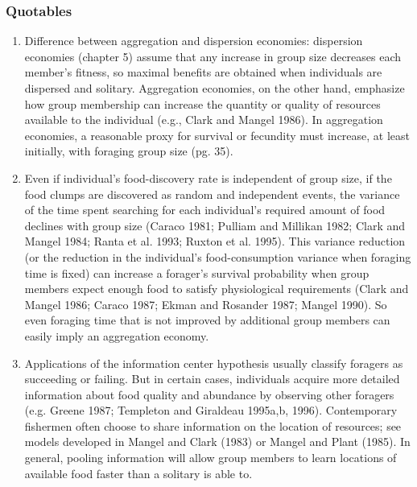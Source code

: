 \documentclass[a4paper,11pt]{article}
\begin{document}
\subsubsection*{Quotables}
\begin{enumerate}
\item Difference between aggregation and dispersion economies: dispersion economies (chapter 5) assume that any increase in group size decreases each member's fitness, so maximal benefits are obtained when individuals are dispersed and solitary. Aggregation economies, on the other hand, emphasize how group membership can increase the quantity or quality of resources available to the individual (e.g., Clark and Mangel 1986). In aggregation economies, a reasonable proxy for survival or fecundity must increase, at least initially, with foraging group size (pg. 35).
\item Even if individual's food-discovery rate is independent of group size, if the food clumps are discovered as random and independent events, the variance of the time spent searching for each individual's required amount of food declines with group size (Caraco 1981; Pulliam and Millikan 1982; Clark and Mangel 1984; Ranta et al. 1993; Ruxton et al. 1995). This variance reduction (or the reduction in the individual's food-consumption variance when foraging time is fixed) can increase a forager's survival probability when group members expect enough food to satisfy physiological requirements (Clark and Mangel 1986; Caraco 1987; Ekman and Rosander 1987; Mangel 1990). So even foraging time that is not improved by additional group members can easily imply an aggregation economy. 
\item Applications of the information center hypothesis usually classify foragers as succeeding or failing. But in certain cases, individuals acquire more detailed information about food quality and abundance by observing other foragers (e.g. Greene 1987; Templeton and Giraldeau 1995a,b, 1996). Contemporary fishermen often choose to share information on the location of resources; see models developed in Mangel and Clark (1983) or Mangel and Plant (1985).  In general, pooling information will allow group members to learn locations of available food faster than a solitary is able to. 
\end{enumerate}
\end{document}
